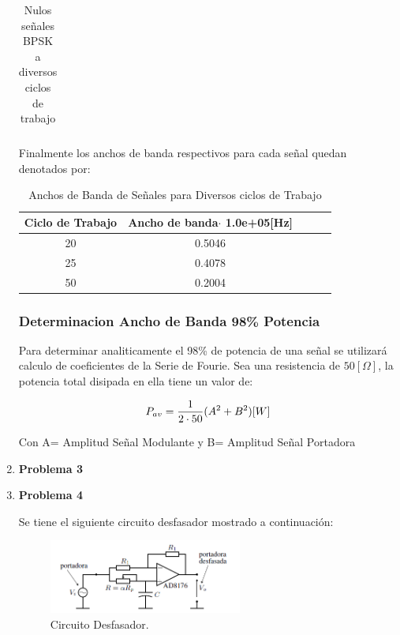 \documentclass[letterpaper, titlepage]{article}
\begin{document}
\begin{enumerate}
\begin{table}[ht]
\begin{tabular}{c c c c c}
			\end{tabular}
			\caption{Nulos señales BPSK a diversos ciclos de trabajo}
			\label{tab:tabla1}
		\end{table}
		
		\begin{center}
		Finalmente los anchos de banda respectivos para cada señal quedan denotados por:
		\end{center}

		\begin{table}[ht]
			\centering
			\begin{tabular}{c c c c c}
				Ciclo de Trabajo & Ancho de banda$\cdot$ 1.0e+05[Hz] \\
				\hline
				20 & 0.5046   \\
				25 & 0.4078	  \\
				50 & 0.2004   \\
			\end{tabular}
			\caption{Anchos de Banda de Señales para Diversos ciclos de Trabajo}
			\label{tab:tabla1}
		\end{table}	

		\subsubsection{Determinacion Ancho de Banda 98\% Potencia}
			Para determinar analiticamente el 98\% de potencia de una señal se utilizará calculo de 			coeficientes de la Serie de Fourie. Sea una resistencia de $50[\Omega]$, la potencia total disipada en ella tiene un valor de:
			
		\begin{equation}	
	P_{av}={1 \over 2 \cdot 50}(A^{2}+B^{2})[W]
		\end{equation}
		
		
	Con A= Amplitud Señal Modulante y B= Amplitud Señal Portadora	
		
		\item \textbf{Problema 3}
		
		\item \textbf{Problema 4}
		
		Se tiene el siguiente circuito desfasador mostrado a continuación:
		
\begin{figure}[H]
  \centering
    \includegraphics[width=0.6\textwidth]{circuitdesf}
  \caption{Circuito Desfasador.}
  \label{fig:ejemplo}
\end{figure}


\end{enumerate}
\end{document}
